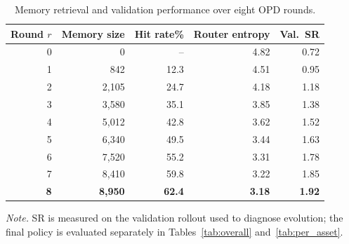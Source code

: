 \begin{table}[t]
\caption{Memory retrieval and validation performance over eight OPD rounds.}
\label{tab:evolution_dynamics}
\centering
\footnotesize
\renewcommand{\arraystretch}{0.93}
\begin{threeparttable}
\begin{tabular*}{\columnwidth}{@{\extracolsep{\fill}}rrrrr}
\toprule
Round $r$ & Memory size & Hit rate\% & Router entropy & Val.\ SR \\
\midrule
0 & 0 & -- & 4.82 & 0.72 \\
1 & 842 & 12.3 & 4.51 & 0.95 \\
2 & 2{,}105 & 24.7 & 4.18 & 1.18 \\
3 & 3{,}580 & 35.1 & 3.85 & 1.38 \\
4 & 5{,}012 & 42.8 & 3.62 & 1.52 \\
5 & 6{,}340 & 49.5 & 3.44 & 1.63 \\
6 & 7{,}520 & 55.2 & 3.31 & 1.78 \\
7 & 8{,}410 & 59.8 & 3.22 & 1.85 \\
\rowcolor{FBest!8}
\textbf{8} & \textbf{8{,}950} & \textbf{62.4} & \textbf{3.18} & \textbf{1.92} \\
\bottomrule
\end{tabular*}
\begin{tablenotes}[flushleft]
\scriptsize
\item \textit{Note.} SR is measured on the validation rollout used to diagnose evolution; the final policy is evaluated separately in Tables~\ref{tab:overall} and~\ref{tab:per_asset}.
\end{tablenotes}
\end{threeparttable}
\end{table}
